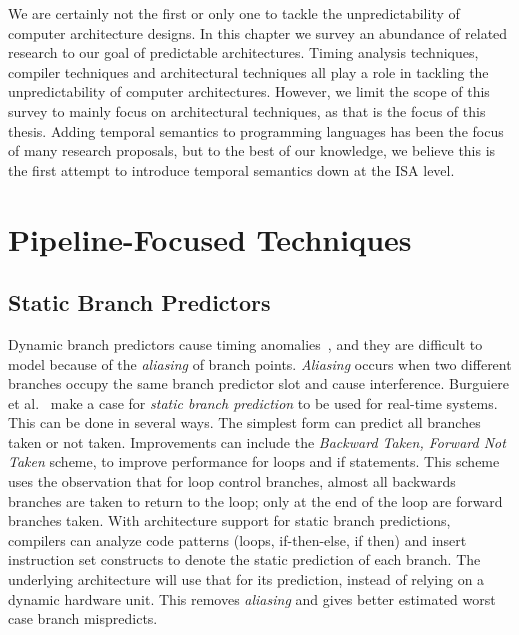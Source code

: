 \label{sec:related_arch_mod}
We are certainly not the first or only one to tackle the unpredictability of computer architecture designs.
In this chapter we survey an abundance of related research to our goal of predictable architectures.
Timing analysis techniques, compiler techniques and architectural techniques all play a role in tackling the unpredictability of computer architectures.
However, we limit the scope of this survey to mainly focus on architectural techniques, as that is the focus of this thesis. 
Adding temporal semantics to programming languages has been the focus of many research proposals, but to the best of our knowledge, we believe this is the first attempt to introduce temporal semantics down at the ISA level. 


\section{Pipeline-Focused Techniques}
\subsection{Static Branch Predictors}
\label{sec:RTBranch}
Dynamic branch predictors cause timing anomalies~\cite{Engblom2003dynbranch}, and they are difficult to model because of the \textit{aliasing} of branch points.   
\textit{Aliasing} occurs when two different branches occupy the same branch predictor slot and cause interference.
Burguiere et al.~\cite{Burguiere2005staticbranchpredict} make a case for \textit{static branch prediction} to be used for real-time systems.
This can be done in several ways. 
The simplest form can predict all branches taken or not taken. 
Improvements can include the \textit{Backward Taken, Forward Not Taken} scheme, to improve performance for loops and if statements.
This scheme uses the observation that for loop control branches, almost all backwards branches are taken to return to the loop; only at the end of the loop are forward branches taken. 
With architecture support for static branch predictions, compilers can analyze code patterns (loops, if-then-else, if then) and insert instruction set constructs to denote the static prediction of each branch.  
The underlying architecture will use that for its prediction, instead of relying on a dynamic hardware unit.
This removes \textit{aliasing} and gives better estimated worst case branch mispredicts. 

